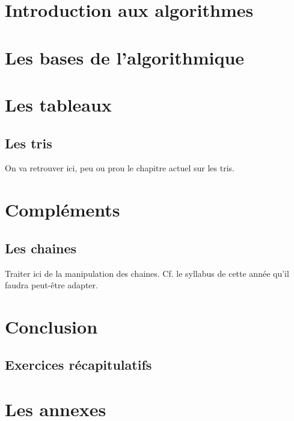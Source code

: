\documentclass[a4paper,doubleside]{book}
\begin{document}

	
	
	

	\part{Introduction aux algorithmes}	
		
		
		

	\part{Les bases de l'algorithmique}
		
		
		
		
		

	\part{Les tableaux}
		
		
		\chapter{Les tris}
			\begin{Note}
			On va retrouver ici,
			peu ou prou le chapitre actuel sur les tris.
			\end{Note}
		
			
	\part{Compléments}
		\chapter{Les chaines}
			\begin{Note}
			Traiter ici de la manipulation des chaines.
			Cf. le syllabus de cette année
			qu'il faudra peut-être adapter.
			\end{Note}

		

	\part{Conclusion}
		\chapter{Exercices récapitulatifs}

	
	\appendix
	
	\part{Les annexes}
		
		
	
	
\end{document}
